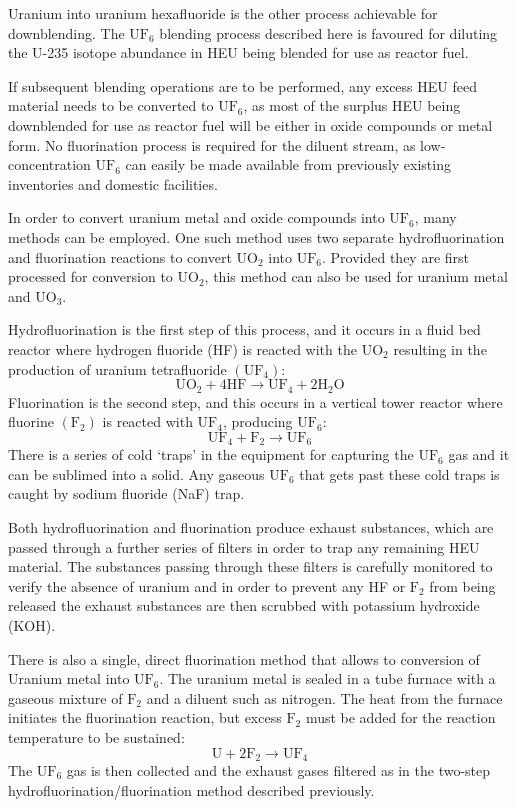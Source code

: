 \documentclass[twoside,titlepage,11pt,twocolumn,a4paper]{article}
\begin{document}
Uranium into uranium hexafluoride is the other process achievable for
downblending.  The \(\mathrm{UF_6}\) blending process described here
is favoured for diluting the U-235 isotope abundance in HEU being
blended for use as reactor fuel.

If subsequent blending operations are to be performed, any excess HEU
feed material needs to be converted to \(\mathrm{UF_6}\), as most of
the surplus HEU being downblended for use as reactor fuel will be
either in oxide compounds or metal form. No fluorination process is
required for the diluent stream, as low-concentration
\(\mathrm{UF_6}\) can easily be made available from previously
existing inventories and domestic facilities.

In order to convert uranium metal and oxide compounds into
\(\mathrm{UF_6}\), many methods can be employed. One such method
uses two separate hydrofluorination and fluorination
reactions to convert \(\mathrm{UO_2}\) into
\(\mathrm{UF_6}\). Provided they are first processed for conversion to
\(\mathrm{UO_2}\), this method can also be used for uranium metal and
\(\mathrm{UO_3}\).

Hydrofluorination is the first step of this process, and it occurs in
a fluid bed reactor where hydrogen fluoride (HF) is reacted with the
\(\mathrm{UO_2}\) resulting in the production of uranium tetrafluoride
\(\mathrm{(UF_4)}\):
\[ \mathrm{ UO_2 + 4HF \rightarrow UF_4 + 2 H_2O } \]
Fluorination is the second step, and this occurs in a vertical tower
reactor where fluorine \(\mathrm{(F_2)}\) is reacted with
\(\mathrm{UF_4}\), producing \(\mathrm{UF_6}\):
\[ \mathrm{ UF_4 + F_2 \rightarrow UF_6 } \]
There is a series of cold `traps' in the equipment for capturing the
\(\mathrm{UF_6}\) gas and it can be sublimed into a solid. Any gaseous
\(\mathrm{UF_6}\) that gets past these cold traps is caught by sodium
fluoride (NaF) trap.

Both hydrofluorination and fluorination produce exhaust substances,
which are passed through a further series of filters in order to trap
any remaining HEU material. The substances passing through these
filters is carefully monitored to verify the absence of uranium and in
order to prevent any HF or \(\mathrm{F_2}\) from being released the
exhaust substances are then scrubbed with potassium hydroxide (KOH).

There is also a single, direct fluorination method that allows to
conversion of Uranium metal into \(\mathrm{UF_6}\). The uranium metal
is sealed in a tube furnace with a gaseous mixture of \(\mathrm{F_2}\)
and a diluent such as nitrogen. The heat from the furnace initiates
the fluorination reaction, but excess \(\mathrm{F_2}\) must be added
for the reaction temperature to be sustained:
\[ \mathrm{ U + 2F_2 \rightarrow UF_4 } \]
The \(\mathrm{UF_6}\) gas is then collected and the exhaust gases
filtered as in the two-step hydrofluorination/fluorination method
described previously. \citep{dilutingUranium}
\end{document}
